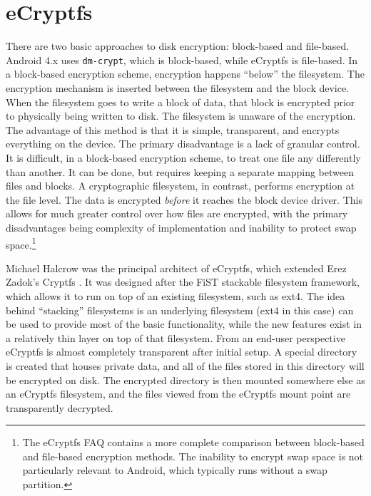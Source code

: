 \section{eCryptfs} 
\label{sec:ecryptfs}
There are two basic approaches to disk encryption: block-based and file-based. Android 4.x uses \texttt{dm-crypt}, which is
block-based, while eCryptfs is file-based.  In a block-based encryption scheme, encryption happens ``below'' the filesystem. The
encryption mechanism is inserted between the filesystem and the block device. When the filesystem goes to write a block of data,
that block is encrypted prior to physically being written to disk. The filesystem is unaware of the encryption. The advantage of
this method is that it is simple, transparent, and encrypts everything on the device. The primary disadvantage is a lack of granular
control. It is difficult, in a block-based encryption scheme, to treat one file any differently than another.  It can be done, but
requires keeping a separate mapping between files and blocks. A cryptographic filesystem, in contrast, performs encryption at the
file level. The data is encrypted \emph{before} it reaches the block device driver. This allows for much greater control over how
files are encrypted, with the primary disadvantages being complexity of implementation and inability to protect swap
space.\footnote{The eCryptfs FAQ contains a more complete comparison between block-based and file-based encryption methods. The
inability to encrypt swap space is not particularly relevant to Android, which typically runs without a swap partition.}

Michael Halcrow was the principal architect of eCryptfs, which extended Erez Zadok's Cryptfs \cite{Halcrow}. It was designed after
the FiST stackable filesystem framework, which allows it to run on top of an existing filesystem, such as ext4. The idea behind
``stacking'' filesystems is an underlying filesystem (ext4 in this case) can be used to provide most of the basic functionality,
while the new features exist in a relatively thin layer on top of that filesystem. From an end-user perspective eCryptfs is almost
completely transparent after initial setup.  A special directory is created that houses private data, and all of the files stored in
this directory will be encrypted on disk. The encrypted directory is then mounted somewhere else as an eCryptfs filesystem, and the files
viewed from the eCryptfs mount point are transparently decrypted. 

